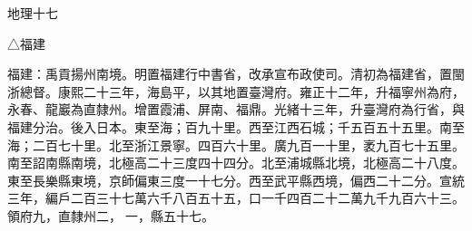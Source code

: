 
\begin{pinyinscope}
地理十七

△福建

福建：禹貢揚州南境。明置福建行中書省，改承宣布政使司。清初為福建省，置閩浙總督。康熙二十三年，海島平，以其地置臺灣府。雍正十二年，升福寧州為府，永春、龍巖為直隸州。增置霞浦、屏南、福鼎。光緒十三年，升臺灣府為行省，與福建分治。後入日本。東至海；百九十里。西至江西石城；千五百五十五里。南至海；二百七十里。北至浙江景寧。四百六十里。廣九百一十里，袤九百七十五里。南至詔南縣南境，北極高二十三度四十四分。北至浦城縣北境，北極高二十八度。東至長樂縣東境，京師偏東三度一十七分。西至武平縣西境，偏西二十二分。宣統三年，編戶二百三十七萬六千八百五十五，口一千四百二十二萬九千九百六十三。領府九，直隸州二，一，縣五十七。


\end{pinyinscope}
